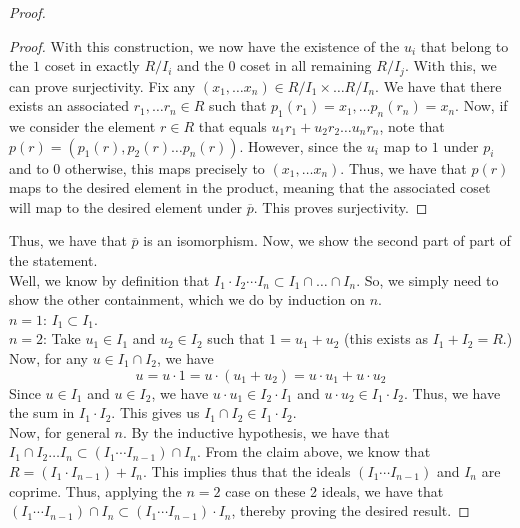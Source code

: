 \begin{proof}
\begin{proof}
        With this construction, we now have the existence of the $u_i$ that belong
        to the $1$ coset in exactly $R/I_i$ and the $0$ coset in all remaining $R/I_j$.
        With this, we can prove surjectivity.
        Fix any $(x_1, \dots x_n) \in R/I_1 \times \dots R/I_n$. We have that there exists
        an associated $r_1, \dots r_n \in R$ such that $p_1(r_1) = x_1, \dots p_n(r_n) = x_n$.
        Now, if we consider the element $r \in R$ that equals $u_1r_1 + u_2r_2 \dots u_nr_n$,
        note that $p(r) = (p_1(r), p_2(r) \dots p_n(r))$. However, since the $u_i$ map to $1$ under
        $p_i$ and to $0$ otherwise, this maps precisely to $(x_1, \dots x_n)$. Thus, we have
 that $p(r)$ maps to the desired element in the product, meaning that the
        associated coset will map to the desired element under $\overline{p}$. This proves
        surjectivity.
    \end{proof}
    Thus, we have that $\overline{p}$ is an isomorphism. Now, we show the second part of
    part of the statement. \\
    Well, we know by definition that $I_1 \cdot I_2 \cdots I_n \subset I_1 \cap \dots \cap I_n$. So,
    we simply need to show the other containment, which we do by induction on $n$. \\
    $n = 1$: $I_1 \subset I_1$. \\
    $n = 2$: Take $u_1 \in I_1$ and $u_2 \in I_2$ such that $1 = u_1 + u_2$ (this exists as $I_1 + I_2 = R$.)
    Now, for any $u \in I_1 \cap I_2$, we have
    $$
    u = u \cdot 1 = u \cdot (u_1 + u_2) = u \cdot u_1 + u \cdot u_2
    $$
    Since $u \in I_1$ and $u \in I_2$, we have $u \cdot u_1 \in I_2 \cdot I_1$ and
    $u \cdot u_2 \in I_1 \cdot I_2$. Thus, we have the sum in $I_1 \cdot I_2$. This gives us
    $I_1 \cap I_2 \in I_1 \cdot I_2$. \\
    Now, for general $n$. By the inductive hypothesis, we have that
    $I_1 \cap I_2 \dots I_n \subset (I_1 \cdots I_{n-1}) \cap I_n$. From the claim above,
    we know that $R = (I_1 \cdot I_{n-1}) + I_n$. This implies thus that the ideals
    $(I_1 \cdots I_{n-1})$ and $I_n$ are coprime. Thus, applying the $n = 2$ case on these
    2 ideals, we have that $(I_1 \cdots I_{n-1}) \cap I_n \subset (I_1 \cdots I_{n-1}) \cdot I_n$,
    thereby proving the desired result.
\end{proof}
